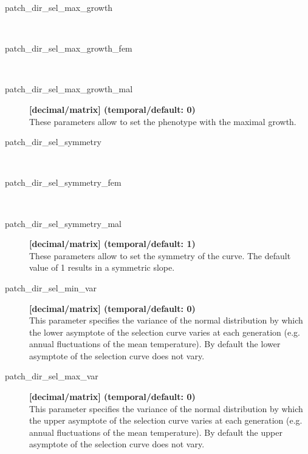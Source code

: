 \documentclass[letterpaper,12pt,oneside]{book}
\begin{document}
\begin{description}
\item[patch\_dir\_sel\_max\_growth]\hspace*{\fill}\\
\vspace{-9mm}
\item[patch\_dir\_sel\_max\_growth\_fem]\hspace*{\fill}\\
\vspace{-9mm}
\item[patch\_dir\_sel\_max\_growth\_mal]\textbf{[decimal/matrix] (temporal/default: 0)}\\
These parameters allow to set the phenotype with the maximal growth.

\item[patch\_dir\_sel\_symmetry]\hspace*{\fill}\\
\vspace{-9mm}
\item[patch\_dir\_sel\_symmetry\_fem]\hspace*{\fill}\\
\vspace{-9mm}
\item[patch\_dir\_sel\_symmetry\_mal]\textbf{[decimal/matrix] (temporal/default: 1)}\\
These parameters allow to set the symmetry of the curve. The default value of 1 results in a symmetric slope. 

\item[patch\_dir\_sel\_min\_var]\textbf{[decimal/matrix] (temporal/default: 0)}\\
This parameter specifies the variance of the normal distribution by which the lower asymptote of the selection curve varies at each generation (e.g. annual fluctuations of the mean temperature). By default the lower asymptote of the selection curve does not vary.

\item[patch\_dir\_sel\_max\_var]\textbf{[decimal/matrix] (temporal/default: 0)}\\
This parameter specifies the variance of the normal distribution by which the upper asymptote of the selection curve varies at each generation (e.g. annual fluctuations of the mean temperature). By default the upper asymptote of the selection curve does not vary.


\end{description}
\end{document}
